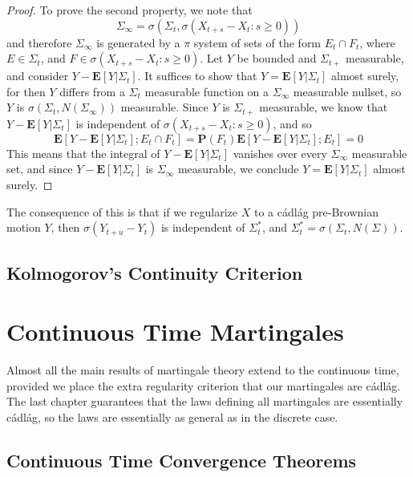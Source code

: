 \begin{proof}
    To prove the second property, we note that
    \[ \Sigma_\infty = \sigma(\Sigma_t, \sigma(X_{t+s} - X_t: s \geq 0)) \]
    and therefore $\Sigma_\infty$ is generated by a $\pi$ system of sets of the form $E_t \cap F_t$, where $E \in \Sigma_t$, and $F \in \sigma(X_{t+s} - X_t: s \geq 0)$. Let $Y$ be bounded and $\Sigma_{t+}$ measurable, and consider $Y - \mathbf{E}[Y|\Sigma_t]$. It suffices to show that $Y = \mathbf{E}[Y|\Sigma_t]$ almost surely, for then $Y$ differs from a $\Sigma_t$ measurable function on a $\Sigma_\infty$ measurable nullset, so $Y$ is $\sigma(\Sigma_t, N(\Sigma_\infty))$ measurable. Since $Y$ is $\Sigma_{t+}$ measurable, we know that $Y - \mathbf{E}[Y|\Sigma_t]$ is independent of $\sigma(X_{t+s} - X_t: s \geq 0)$, and so
    \[ \mathbf{E}[Y - \mathbf{E}[Y|\Sigma_t];E_t \cap F_t] = \mathbf{P}(F_t) \mathbf{E}[Y - \mathbf{E}[Y|\Sigma_t];E_t] = 0 \]
    This means that the integral of $Y - \mathbf{E}[Y|\Sigma_t]$ vanishes over every $\Sigma_\infty$ measurable set, and since $Y - \mathbf{E}[Y|\Sigma_t]$ is $\Sigma_\infty$ measurable, we conclude $Y = \mathbf{E}[Y|\Sigma_t]$ almost surely.
\end{proof}

The consequence of this is that if we regularize $X$ to a c\'{a}dl\'{a}g pre-Brownian motion $Y$, then $\sigma(Y_{t+u} - Y_t)$ is independent of $\Sigma^*_t$, and $\Sigma^*_t = \sigma(\Sigma_t, N(\Sigma))$.

\section{Kolmogorov's Continuity Criterion}

\chapter{Continuous Time Martingales}

Almost all the main results of martingale theory extend to the continuous time, provided we place the extra regularity criterion that our martingales are c\'{a}dl\'{a}g. The last chapter guarantees that the laws defining all martingales are essentially c\'{a}dl\'{a}g, so the laws are essentially as general as in the discrete case.

\section{Continuous Time Convergence Theorems}


